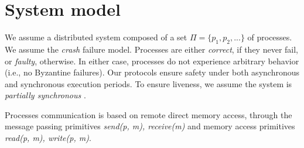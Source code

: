 \section{System model}
\label{sec:system-model}
We assume a distributed system composed of a set $\Pi = \{p_1, p_2, ...\}$  of
processes. We assume the \emph{crash} failure model. Processes are either
\emph{correct}, if they never fail, or \emph{faulty}, otherwise. In either case,
processes do not experience arbitrary behavior (i.e., no Byzantine failures).
Our protocols ensure safety under both asynchronous and synchronous execution
periods. To ensure liveness, we assume the system is \emph{partially
synchronous} \cite{DLS88}.

Processes communication is based on remote direct memory access, through the
message passing primitives \emph{send(p, m), receive(m)} and memory access
primitives \emph{read(p, m), write(p, m)}.